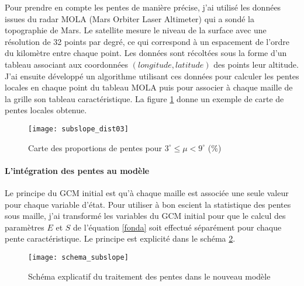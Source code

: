 \documentclass[11pt,a4paper]{article}
\begin{document}
Pour prendre en compte les pentes de manière précise, j'ai utilisé les données issues du radar MOLA (Mars Orbiter Laser Altimeter) qui a sondé la topographie de Mars. Le satellite mesure le niveau de la surface avec une résolution de 32 points par degré, ce qui correspond à un espacement de l'ordre du kilomètre entre chaque point. Les données sont récoltées sous la forme d'un tableau associant aux coordonnées $(longitude,latitude)$ des points leur altitude. J'ai ensuite développé un algorithme utilisant ces données pour calculer les pentes locales en chaque point du tableau MOLA puis pour associer à chaque maille de la grille son tableau caractéristique. La figure \ref{subslope_dist03} donne un exemple de carte de pentes locales obtenue. \\

\begin{figure}[h!]
\begin{center}
\texttt{[image: subslope\_dist03]}
\caption{Carte des proportions de pentes pour $3^\circ \leq \mu<9^\circ$ ($\%$)}
\label{subslope_dist03}
\end{center}
\end{figure}


\paragraph{L'intégration des pentes au modèle \\}
Le principe du GCM initial est qu'à chaque maille est associée une seule valeur pour chaque variable d'état. Pour utiliser à bon escient la statistique des pentes sous maille, j'ai transformé les variables du GCM initial pour que le calcul des paramètres $E$ et $S$ de l'équation \ref{fonda} soit effectué séparément pour chaque pente caractéristique. Le principe est explicité dans le schéma \ref{schema_slopes}. \\

\begin{figure}[h!]
\begin{center}
\texttt{[image: schema\_subslope]}
\caption{Schéma explicatif du traitement des pentes dans le nouveau modèle}
\label{schema_slopes}
\end{center}
\end{figure}
\end{document}
